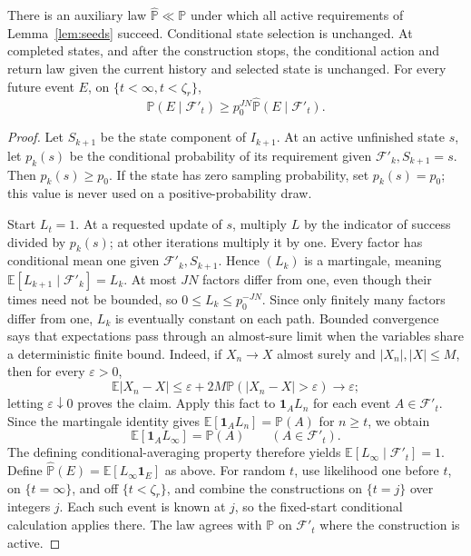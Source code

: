 \begin{lemma}\label{lem:measure}
There is an auxiliary law $\widehat{\mathbb P}\ll\mathbb P$
under which all active requirements of Lemma~\ref{lem:seeds} succeed. Conditional state selection is
unchanged. At completed states, and after the construction stops, the conditional action and
return law given the current history and selected state is unchanged. For every future event
$E$, on $\{t<\infty,t<\zeta_r\}$,
\begin{equation}\label{eq:transfer}
\mathbb P(E\mid\mathcal F'_t)\ge p_0^{JN}\widehat{\mathbb P}(E\mid\mathcal F'_t).
\end{equation}
\end{lemma}
\begin{proof}
Let $S_{k+1}$ be the state component of $I_{k+1}$. At an active unfinished state $s$, let
$p_k(s)$ be the conditional probability of its requirement given $\mathcal F'_k,S_{k+1}=s$. Then $p_k(s)\ge p_0$.
If the state has zero sampling probability, set $p_k(s)=p_0$; this value is never used on a
positive-probability draw.

Start $L_t=1$. At a requested update of $s$, multiply $L$ by the indicator of success divided
by $p_k(s)$; at other iterations multiply it by one. Every factor has conditional mean one given
$\mathcal F'_k,S_{k+1}$. Hence $(L_k)$ is a martingale, meaning $\mathbb E[L_{k+1}\mid\mathcal F'_k]=L_k$. At most $JN$ factors differ from one, even though their
times need not be bounded, so $0\le L_k\le p_0^{-JN}$. Since only finitely many factors differ from one, $L_k$ is eventually constant on each path. Bounded convergence says that expectations pass through an almost-sure limit when the variables share a deterministic finite bound. Indeed, if $X_n\to X$ almost surely and $|X_n|,|X|\le M$, then for every $\varepsilon>0$,
\[
\mathbb E|X_n-X|\le\varepsilon+2M\mathbb P(|X_n-X|>\varepsilon)\longrightarrow\varepsilon;
\]
letting $\varepsilon\downarrow0$ proves the claim. Apply this fact to $\mathbf1_A L_n$ for each event $A\in\mathcal F'_t$. Since the martingale identity gives $\mathbb E[\mathbf1_A L_n]=\mathbb P(A)$ for $n\ge t$, we obtain
\[
\mathbb E[\mathbf1_A L_\infty]=\mathbb P(A)\qquad(A\in\mathcal F'_t).
\]
The defining conditional-averaging property therefore yields $\mathbb E[L_\infty\mid\mathcal F'_t]=1$.
Define $\widehat{\mathbb P}(E)=\mathbb E[L_\infty\mathbf1_E]$ as above. For random $t$, use likelihood one before $t$, on $\{t=\infty\}$, and off $\{t<\zeta_r\}$,
and combine the constructions on $\{t=j\}$ over integers $j$. Each such event is known at $j$, so the fixed-start conditional calculation applies there. The law agrees with $\mathbb P$ on $\mathcal F'_t$
where the construction is active.


\end{proof}
